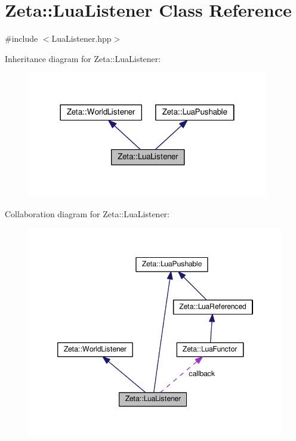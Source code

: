 \hypertarget{classZeta_1_1LuaListener}{\section{Zeta\+:\+:Lua\+Listener Class Reference}
\label{classZeta_1_1LuaListener}
}


{\ttfamily \#include $<$Lua\+Listener.\+hpp$>$}



Inheritance diagram for Zeta\+:\+:Lua\+Listener\+:\nopagebreak
\begin{figure}[H]
\begin{center}
\leavevmode
\includegraphics[width=298pt]{classZeta_1_1LuaListener__inherit__graph}
\end{center}
\end{figure}


Collaboration diagram for Zeta\+:\+:Lua\+Listener\+:\nopagebreak
\begin{figure}[H]
\begin{center}
\leavevmode
\includegraphics[width=346pt]{classZeta_1_1LuaListener__coll__graph}
\end{center}
\end{figure}
